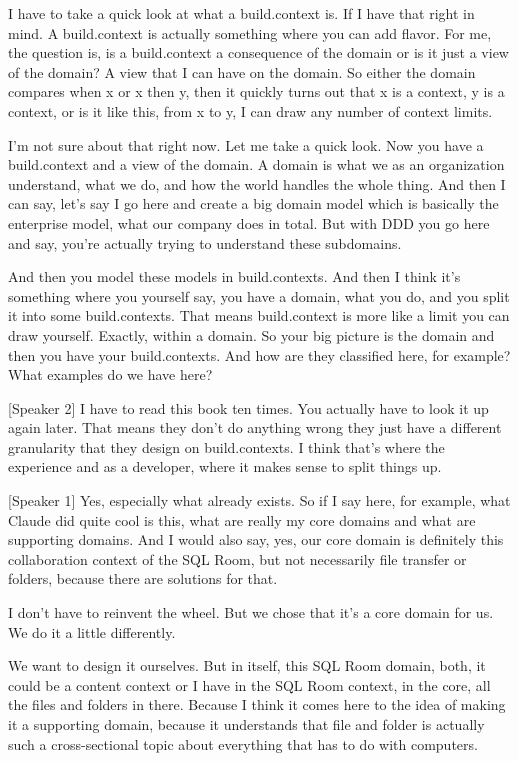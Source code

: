 I have to take a quick look at what a build.context is. If I have that right in mind. A build.context is actually something where you can add flavor. For me, the question is, is a build.context a consequence of the domain or is it just a view of the domain? A view that I can have on the domain. So either the domain compares when x or x then y, then it quickly turns out that x is a context, y is a context, or is it like this, from x to y, I can draw any number of context limits.

I'm not sure about that right now. Let me take a quick look. Now you have a build.context and a view of the domain. A domain is what we as an organization understand, what we do, and how the world handles the whole thing. And then I can say, let's say I go here and create a big domain model which is basically the enterprise model, what our company does in total. But with DDD you go here and say, you're actually trying to understand these subdomains.

And then you model these models in build.contexts. And then I think it's something where you yourself say, you have a domain, what you do, and you split it into some build.contexts. That means build.context is more like a limit you can draw yourself. Exactly, within a domain. So your big picture is the domain and then you have your build.contexts. And how are they classified here, for example? What examples do we have here?

[Speaker 2]
I have to read this book ten times. You actually have to look it up again later. That means they don't do anything wrong they just have a different granularity that they design on build.contexts. I think that's where the experience and as a developer, where it makes sense to split things up.

[Speaker 1]
Yes, especially what already exists. So if I say here, for example, what Claude did quite cool is this, what are really my core domains and what are supporting domains. And I would also say, yes, our core domain is definitely this collaboration context of the SQL Room, but not necessarily file transfer or folders, because there are solutions for that.

I don't have to reinvent the wheel. But we chose that it's a core domain for us. We do it a little differently.

We want to design it ourselves. But in itself, this SQL Room domain, both, it could be a content context or I have in the SQL Room context, in the core, all the files and folders in there. Because I think it comes here to the idea of ​​making it a supporting domain, because it understands that file and folder is actually such a cross-sectional topic about everything that has to do with computers.

